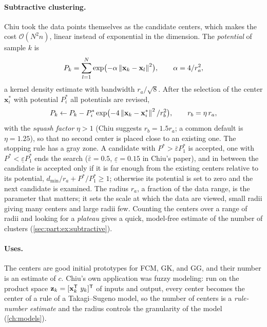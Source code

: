 \paragraph{Subtractive clustering.} Chiu \cite{chiu:1994:subtractive} took the data points themselves as the candidate centers, which makes the cost $\mathcal{O}(N^2n)$, linear instead of exponential in the dimension. The \emph{potential} of sample $k$ is
\begin{equation}
  P_k=\sum_{l=1}^{N}\exp\bigl(-\alpha\left\lVert \mathbf{x}_k-\mathbf{x}_l \right\rVert^2\bigr),\qquad \alpha=4/r_a^2,
  \label{eq:part:potential}
\end{equation}
a kernel density estimate with bandwidth $r_a/\sqrt8$. After the selection of the center $\mathbf{x}^*_i$ with potential $P^*_i$ all potentials are revised,
\begin{equation}
  P_k\leftarrow P_k-P^*_i\exp\bigl(-4\left\lVert \mathbf{x}_k-\mathbf{x}^*_i \right\rVert^2/r_b^2\bigr),\qquad r_b=\eta\,r_a,
  \label{eq:part:subtract}
\end{equation}
with the \emph{squash factor} $\eta>1$ (Chiu suggests $r_b=1.5r_a$; a common default is $\eta=1.25$), so that no second center is placed close to an existing one. The stopping rule has a gray zone. A candidate with $P^*>\bar\varepsilon P^*_1$ is accepted, one with $P^*<\underline\varepsilon P^*_1$ ends the search ($\bar\varepsilon=0.5$, $\underline\varepsilon=0.15$ in Chiu's paper), and in between the candidate is accepted only if it is far enough from the existing centers relative to its potential, $d_{\min}/r_a+P^*/P^*_1\ge1$; otherwise its potential is set to zero and the next candidate is examined. The radius $r_a$, a fraction of the data range, is the parameter that matters; it sets the scale at which the data are viewed, small radii giving many centers and large radii few. Counting the centers over a range of radii and looking for a \emph{plateau} gives a quick, model-free estimate of the number of clusters (\cref{sec:part:ex:subtractive}).

\paragraph{Uses.} The centers are good initial prototypes for FCM, GK, and GG, and their number is an estimate of $c$. Chiu's own application was fuzzy modeling: run on the product space $\mathbf{z}_k=[\mathbf{x}_k^{\mathsf{T}}\ y_k]^{\mathsf{T}}$ of inputs and output, every center becomes the center of a rule of a Takagi--Sugeno model, so the number of centers is a \emph{rule-number estimate} and the radius controls the granularity of the model (\cref{ch:models}).

